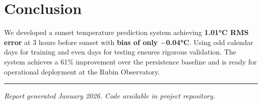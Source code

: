 \documentclass[11pt,letterpaper]{article}
\begin{document}
\section{Conclusion}

We developed a sunset temperature prediction system achieving \textbf{1.01°C RMS error} at 3 hours before sunset with \textbf{bias of only $-$0.04°C}. Using odd calendar days for training and even days for testing ensures rigorous validation. The system achieves a 61\% improvement over the persistence baseline and is ready for operational deployment at the Rubin Observatory.

\vspace{1em}
\hrule
\vspace{0.5em}
\small
\textit{Report generated January 2026. Code available in project repository.}
\end{document}
